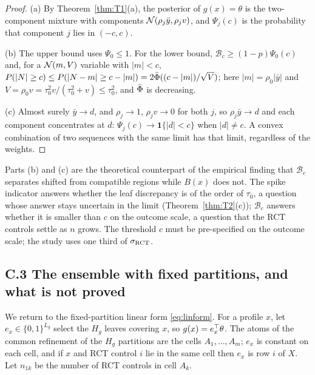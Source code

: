 \begin{proof}
(a) By Theorem~\ref{thm:T1}(a), the posterior of $g(x)=\theta$ is the two-component mixture with components $\mathcal{N}(\rho_j\bar y,\rho_jv)$, and $\Psi_j(c)$ is the probability that component $j$ lies in $(-c,c)$.

(b) The upper bound uses $\Psi_0\le1$. For the lower bound, $\mathcal B_c\ge(1-p)\Psi_0(c)$ and, for a $\mathcal{N}(m,V)$ variable with $|m|<c$, $P(|N|\ge c)\le P(|N-m|\ge c-|m|)=2\bar\Phi((c-|m|)/\sqrt V)$; here $|m|=\rho_0|\bar y|$ and $V=\rho_0v=\tau_0^2v/(\tau_0^2+v)\le\tau_0^2$, and $\bar\Phi$ is decreasing.

(c) Almost surely $\bar y\to d$, and $\rho_j\to1$, $\rho_jv\to0$ for both $j$, so $\rho_j\bar y\to d$ and each component concentrates at $d$: $\Psi_j(c)\to\mathbf 1\{|d|<c\}$ when $|d|\ne c$. A convex combination of two sequences with the same limit has that limit, regardless of the weights.
\end{proof}

\begin{remA}\label{rem:whygmap}
Parts (b) and (c) are the theoretical counterpart of the empirical finding that $\mathcal B_c$ separates shifted from compatible regions while $B(x)$ does not. The spike indicator answers whether the leaf discrepancy is of the order of $\tau_0$, a question whose answer stays uncertain in the limit (Theorem~\ref{thm:T2}(c)); $\mathcal B_c$ answers whether it is smaller than $c$ on the outcome scale, a question that the RCT controls settle as $n$ grows. The threshold $c$ must be pre-specified on the outcome scale; the study uses one third of $\sigma_{\rm RCT}$.
\end{remA}

\subsection*{C.3 The ensemble with fixed partitions, and what is not proved}

We return to the fixed-partition linear form \eqref{eq:linform}. For a profile $x$, let $e_x\in\{0,1\}^{L_g}$ select the $H_g$ leaves covering $x$, so $g(x)=e_x^{\top}\theta$. The atoms of the common refinement of the $H_g$ partitions are the cells $A_1,\dots,A_m$; $e_x$ is constant on each cell, and if $x$ and RCT control $i$ lie in the same cell then $e_x$ is row $i$ of $X$. Let $n_{1k}$ be the number of RCT controls in cell $A_k$.

